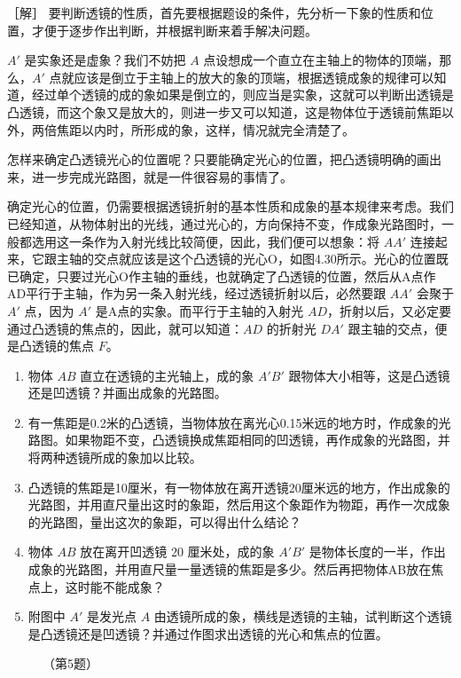 ［解］
要判断透镜的性质，首先要根据题设的条件，先分析一下象的性质和位置，才便于逐步作出判断，并根据判断来着手解决问题。

\(A'\) 是实象还是虚象？我们不妨把 \(A\)
点设想成一个直立在主轴上的物体的顶端，那么，\(A'\)
点就应该是倒立于主轴上的放大的象的顶端，根据透镜成象的规律可以知道，经过单个透镜的成的象如果是倒立的，则应当是实象，这就可以判断出透镜是凸透镜，而这个象又是放大的，则进一步又可以知道，这是物体位于透镜前焦距以外，两倍焦距以内时，所形成的象，这样，情况就完全清楚了。

怎样来确定凸透镜光心的位置呢？只要能确定光心的位置，把凸透镜明确的画出来，进一步完成光路图，就是一件很容易的事情了。

确定光心的位置，仍需要根据透镜折射的基本性质和成象的基本规律来考虑。我们已经知道，从物体射出的光线，通过光心的，方向保持不变，作成象光路图时，一般都选用这一条作为入射光线比较简便，因此，我们便可以想象：将
\(AA'\)
连接起来，它跟主轴的交点就应该是这个凸透镜的光心O，如图4.30所示。光心的位置既已确定，只要过光心O作主轴的垂线，也就确定了凸透镜的位置，然后从A点作AD平行于主轴，作为另一条入射光线，经过透镜折射以后，必然要跟
\(AA'\) 会聚于 \(A'\) 点，因为 \(A'\) 是A点的实象。而平行于主轴的入射光
\(AD\)，折射以后，又必定要通过凸透镜的焦点的，因此，就可以知道：\(AD\)
的折射光 \(DA'\) 跟主轴的交点，便是凸透镜的焦点 \(F\)。

\begin{enumerate}
\item
  物体 \(AB\) 直立在透镜的主光轴上，成的象 \(A'B'\)
  跟物体大小相等，这是凸透镜还是凹透镜？并画出成象的光路图。
\item
  有一焦距是0.2米的凸透镜，当物体放在离光心0.15米远的地方时，作成象的光路图。如果物距不变，凸透镜换成焦距相同的凹透镜，再作成象的光路图，并将两种透镜所成的象加以比较。
\item
  凸透镜的焦距是10厘米，有一物体放在离开透镜20厘米远的地方，作出成象的光路图，并用直尺量出这时的象距，然后用这个象距作为物距，再作一次成象的光路图，量出这次的象距，可以得出什么结论？
\item
  物体 \(AB\) 放在离开凹透镜 20 厘米处，成的象 \(A'B'\)
  是物体长度的一半，作出成象的光路图，并用直尺量一量透镜的焦距是多少。然后再把物体AB放在焦点上，这时能不能成象？
\item
  附图中 \(A'\) 是发光点 \(A\)
  由透镜所成的象，横线是透镜的主轴，试判断这个透镜是凸透镜还是凹透镜？并通过作图求出透镜的光心和焦点的位置。
\end{enumerate}

\begin{figure}
\centering

\caption{（第5题）}
\end{figure}

